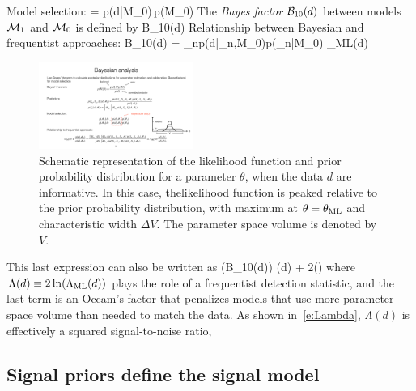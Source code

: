 Model selection:
\be
{} =
{p(d|{\cal M}_0)\,p({\cal M}_0)}
\ee
%
The {\em Bayes factor} ${\cal B}_{10}(d)$ between models 
${\cal M}_1$ and ${\cal M}_0$ is defined by
%
\be
{\cal B}_{10}(d)\equiv {}
\ee
%
Relationship between Bayesian and frequentist approaches:
\be
{\cal B}_{10}(d) 
\equiv{}
= 
{\vec\theta_n\>p(d|\vec\theta_n,{\cal M}_0)p(\vec\theta_n|{\cal M}_0)}
\simeq\Lambda_{\rm ML}(d)\,
\ee
%
\begin{figure}[htbp!]
\begin{center}
\includegraphics[width=0.45\textwidth]{Figures/informative_data}
\caption{Schematic representation of the likelihood function
and prior probability distribution for a parameter $\theta$,
when the data $d$ are informative.
In this case, thelikelihood function is peaked relative to the 
prior probability distribution, with maximum at 
$\theta=\theta_{\rm ML}$ and characteristic width $\Delta V$.
The parameter space volume is denoted by $V$.}
\label{f:informative_data}
\end{center}
\end{figure}
%
This last expression can also be written as
%
\ln({\cal B}_{10}(d)) \simeq \Lambda(d) + 
2\ln\left(\right)
\ee
%
where $\Lambda(d)\equiv 2\ln(\Lambda_{\rm ML}(d))$
plays the role of a frequentist detection statistic, 
and the last term is an Occam's factor that penalizes
models that use more parameter space volume than needed
to match the data.
As shown in~\eqref{e:Lambda}, $\Lambda(d)$ is effectively
a squared signal-to-noise ratio,

\subsection{Signal priors define the signal model}

